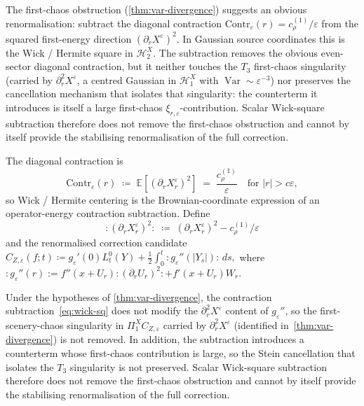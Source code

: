 \documentclass[EJP]{ejpecp}
\renewcommand{\E}{\mathbb{E}}
\newcommand{\Hilb}{\mathcal{H}}
\newcommand{\IBM}{Z}
\newcommand{\Pir}{\Pi}
\DeclareMathOperator{\Var}{Var}
\begin{document}
The first-chaos obstruction (\cref{thm:var-divergence}) suggests an
obvious renormalisation: subtract the diagonal contraction
$\mathrm{Contr}_\varepsilon(r)=c_\rho^{(1)}/\varepsilon$ from the
squared first-energy direction $(\partial_r X^\varepsilon)^{2}$. In
Gaussian source coordinates this is the Wick / Hermite square in
$\Hilb_2^X$. The subtraction removes the obvious even-sector
diagonal contraction, but it neither touches the $T_3$ first-chaos
singularity (carried by $\partial_r^{2}X^\varepsilon$, a centred
Gaussian in $\Hilb_1^X$ with $\Var\sim\varepsilon^{-3}$) nor
preserves the cancellation mechanism that isolates that singularity:
the counterterm it introduces is itself a large first-chaos
$\xi_{r,\varepsilon}$-contribution. Scalar Wick-square subtraction
therefore does not remove the first-chaos obstruction and cannot by
itself provide the stabilising renormalisation of the full
correction.

The diagonal contraction is
\begin{equation}\label{eq:contraction}
  \mathrm{Contr}_\varepsilon(r)\;\coloneqq\;\E[(\partial_rX^\varepsilon_r)^{2}]
  \;=\;\frac{c_\rho^{(1)}}{\varepsilon}\quad\text{for }|r|>c\varepsilon,
\end{equation}
so Wick / Hermite centering is the Brownian-coordinate expression of
an operator-energy contraction subtraction. Define
\begin{equation}\label{eq:wick-sq}
  :(\partial_rX^\varepsilon_r)^{2}:\;\coloneqq\;
  (\partial_rX^\varepsilon_r)^{2}-c_\rho^{(1)}/\varepsilon
\end{equation}
and the renormalised correction candidate
\(
  \widehat C_{\IBM,\varepsilon}(f;t)
  \coloneqq g_\varepsilon'(0)L_t^{0}(Y)+\tfrac12\!\int_0^t\!
   :g_\varepsilon''(|Y_s|):\,ds,
\)
where $:g_\varepsilon''(r):=f''(x+U_r):(\partial_rU_r)^{2}:+f'(x+U_r)W_r$.

\begin{proposition}
\label{prop:wick-insufficient}
Under the hypotheses of \cref{thm:var-divergence}, the contraction
subtraction~\eqref{eq:wick-sq} does not modify the
$\partial_r^{2}X^\varepsilon$ content of $g_\varepsilon''$, so the
first-scenery-chaos singularity in $\Pir_1^X C_{\IBM,\varepsilon}$
carried by $\partial_r^{2}X^\varepsilon$ (identified
in~\cref{thm:var-divergence}) is not removed. In addition, the
subtraction introduces a counterterm whose first-chaos contribution
is large, so the Stein cancellation that isolates the $T_3$
singularity is not preserved. Scalar Wick-square subtraction
therefore does not remove the first-chaos obstruction and cannot by
itself provide the stabilising renormalisation of the full
correction.
\end{proposition}
\end{document}
